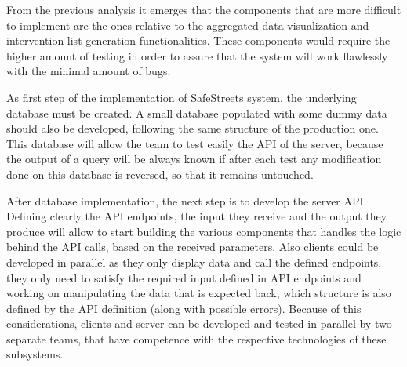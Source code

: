 From the previous analysis it emerges that the components that are more difficult to implement are the ones relative to the aggregated data visualization and intervention list generation functionalities. These components would require the higher amount of testing in order to assure that the system will work flawlessly with the minimal amount of bugs.

As first step of the implementation of SafeStreets system, the underlying database must be created. A small database populated with some dummy data should also be developed, following the same structure of the production one. This database will allow the team to test easily the API of the server, because the output of a query will be always known if after each test any modification done on this database is reversed, so that it remains untouched.

After database implementation, the next step is to develop the server API. Defining clearly the API endpoints, the input they receive and the output they produce will allow to start building the various components that handles the logic behind the API calls, based on the received parameters. Also clients could be developed in parallel as they only display data and call the defined endpoints, they only need to satisfy the required input defined in API endpoints and working on manipulating the data that is expected back, which structure is also defined by the API definition (along with possible errors). Because of this considerations, clients and server can be developed and tested in parallel by two separate teams, that have competence with the respective technologies of these subsystems.

